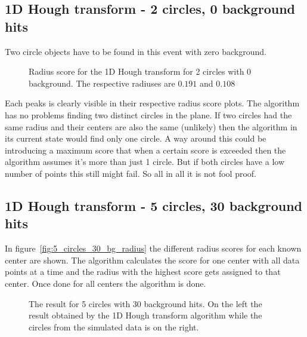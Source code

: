 \documentclass[11pt,twoside]{scrreprt}
\begin{document}
\subsection{1D Hough transform - 2 circles, 0 background hits} %
\label{sub:1d_hough_transform_2_circles_0_background}
Two circle objects have to be found in this event with zero background.
\begin{figure}[htp]
                \label{fig:2c0bg_radius1}
                \label{fig:2c0b_radius2}
        \caption{Radius score for the 1D Hough transform for 2 circles with 0 background. The respective radiuses are $0.191$ and $0.108$ }\label{fig:1d_ht_radius}
\end{figure}
Each peaks is clearly visible in their respective radius score plots. The algorithm has no problems finding two distinct circles in the plane.
If two circles had the same radius and their centers are also the same (unlikely) then the algorithm in its current state would find only one circle.
A way around this could be introducing a maximum score that when a certain score is exceeded then the algorithm assumes it's more than just 1 circle.
But if both circles have a low number of points this still might fail. So all in all it is not fool proof.

\subsection{1D Hough transform - 5 circles, 30 background hits} %
\label{sub:1d_hough_transform_5_circles_30_background_hits}
In figure~\ref{fig:5_circles_30_bg_radius} the different radius scores for each known center are shown. The algorithm calculates 
the score for one center with all data points at a time and the radius with the highest score gets assigned to that center.
Once done for all centers the algorithm is done.
\begin{figure}[ht!]
  \centering
  \caption[5 circles, 30 background hits result]{The result for 5 circles with 30 background hits. On the left the result obtained by 
  the 1D Hough transform algorithm while the circles from the simulated data is on the right.}
  \label{fig:1d_5c_30bg}
\end{figure}
\end{document}
